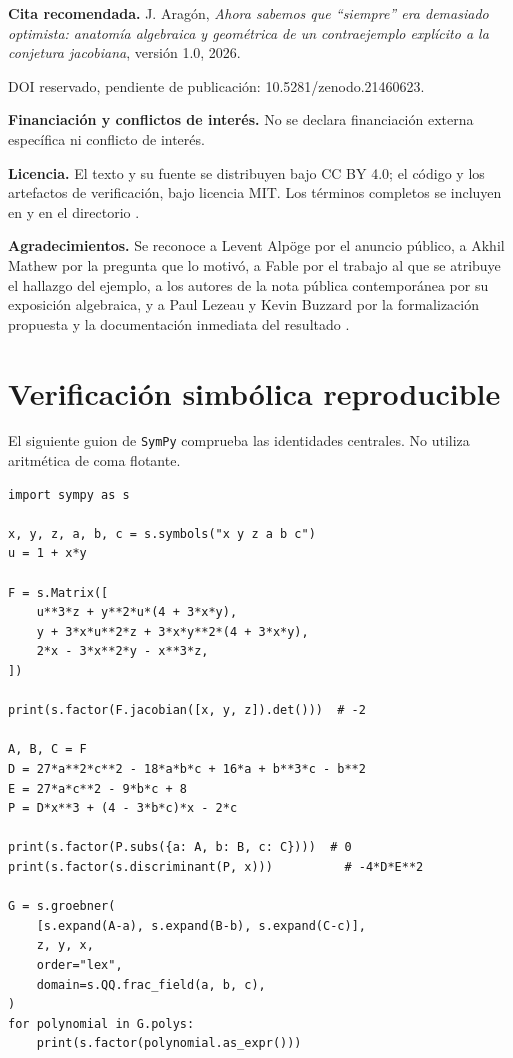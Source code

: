\documentclass[11pt]{article}
\newcommand{\paperdoi}{10.5281/zenodo.21460623}
\theoremstyle{definition}
\theoremstyle{remark}
\begin{document}
\textbf{Cita recomendada.}
J. Arag\'on, \emph{Ahora sabemos que ``siempre'' era demasiado optimista:
anatom\'ia algebraica y geom\'etrica de un contraejemplo expl\'icito a la
conjetura jacobiana}, versi\'on 1.0, 2026.
\par\noindent
DOI reservado, pendiente de publicaci\'on: \paperdoi.

\textbf{Financiaci\'on y conflictos de inter\'es.}
No se declara financiaci\'on externa espec\'ifica ni conflicto de inter\'es.

\textbf{Licencia.}
El texto y su fuente se distribuyen bajo CC BY 4.0; el c\'odigo y los
artefactos de verificaci\'on, bajo licencia MIT. Los t\'erminos completos se
incluyen en  y en el directorio .

\textbf{Agradecimientos.}
Se reconoce a Levent Alp\"oge por el anuncio p\'ublico, a Akhil Mathew por la
pregunta que lo motiv\'o, a Fable por el trabajo al que se atribuye el hallazgo
del ejemplo, a los autores de la nota p\'ublica contempor\'anea por su
exposici\'on algebraica, y a Paul Lezeau y Kevin Buzzard por la formalizaci\'on
propuesta y la documentaci\'on inmediata del resultado
\cite{AlpogeAnnouncement2026,CounterexampleNote2026,LezeauLean2026,Buzzard2026}.

\appendix

\section{Verificaci\'on simb\'olica reproducible}\label{app:reproducibility}

El siguiente guion de \texttt{SymPy} comprueba las identidades centrales. No
utiliza aritm\'etica de coma flotante.

\small
\begin{verbatim}
import sympy as s

x, y, z, a, b, c = s.symbols("x y z a b c")
u = 1 + x*y

F = s.Matrix([
    u**3*z + y**2*u*(4 + 3*x*y),
    y + 3*x*u**2*z + 3*x*y**2*(4 + 3*x*y),
    2*x - 3*x**2*y - x**3*z,
])

print(s.factor(F.jacobian([x, y, z]).det()))  # -2

A, B, C = F
D = 27*a**2*c**2 - 18*a*b*c + 16*a + b**3*c - b**2
E = 27*a*c**2 - 9*b*c + 8
P = D*x**3 + (4 - 3*b*c)*x - 2*c

print(s.factor(P.subs({a: A, b: B, c: C})))  # 0
print(s.factor(s.discriminant(P, x)))          # -4*D*E**2

G = s.groebner(
    [s.expand(A-a), s.expand(B-b), s.expand(C-c)],
    z, y, x,
    order="lex",
    domain=s.QQ.frac_field(a, b, c),
)
for polynomial in G.polys:
    print(s.factor(polynomial.as_expr()))
\end{verbatim}
\normalsize
\end{document}

